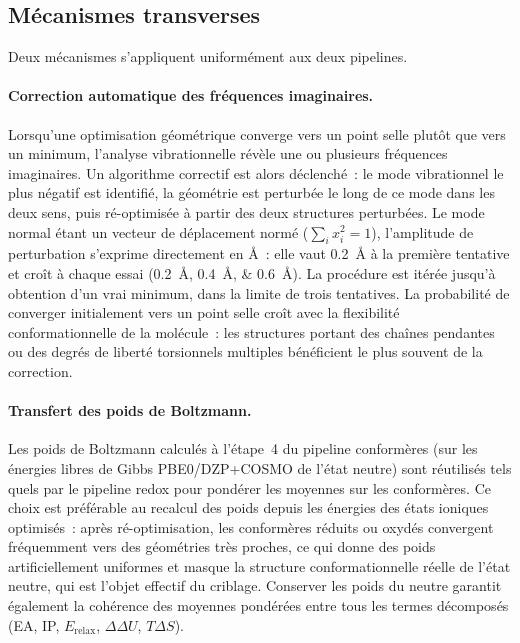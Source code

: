 \subsection{Mécanismes transverses}

Deux mécanismes s'appliquent uniformément aux deux pipelines.

\paragraph{Correction automatique des fréquences imaginaires.}
Lorsqu'une optimisation géométrique converge vers un point selle plutôt que vers un minimum, l'analyse vibrationnelle révèle une ou plusieurs fréquences imaginaires. Un algorithme correctif est alors déclenché~: le mode vibrationnel le plus négatif est identifié, la géométrie est perturbée le long de ce mode dans les deux sens, puis ré-optimisée à partir des deux structures perturbées. Le mode normal étant un vecteur de déplacement normé ($\sum_i x_i^2 = 1$), l'amplitude de perturbation s'exprime directement en \si{\angstrom}~: elle vaut \SI{0.2}{\angstrom} à la première tentative et croît à chaque essai (\SIlist{0.2;0.4;0.6}{\angstrom}). La procédure est itérée jusqu'à obtention d'un vrai minimum, dans la limite de trois tentatives. La probabilité de converger initialement vers un point selle croît avec la flexibilité conformationnelle de la molécule~: les structures portant des chaînes pendantes ou des degrés de liberté torsionnels multiples bénéficient le plus souvent de la correction.

\paragraph{Transfert des poids de Boltzmann.}
Les poids de Boltzmann calculés à l'étape~4 du pipeline conformères (sur les énergies libres de Gibbs PBE0/DZP+COSMO de l'état neutre) sont réutilisés tels quels par le pipeline redox pour pondérer les moyennes sur les conformères. Ce choix est préférable au recalcul des poids depuis les énergies des états ioniques optimisés~: après ré-optimisation, les conformères réduits ou oxydés convergent fréquemment vers des géométries très proches, ce qui donne des poids artificiellement uniformes et masque la structure conformationnelle réelle de l'état neutre, qui est l'objet effectif du criblage. Conserver les poids du neutre garantit également la cohérence des moyennes pondérées entre tous les termes décomposés (EA, IP, $E_{\text{relax}}$, $\Delta\Delta U$, $T\Delta S$).

